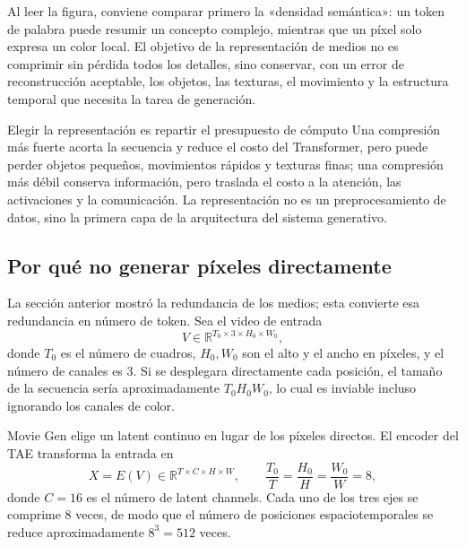 
Al leer la figura, conviene comparar primero la «densidad semántica»: un token de palabra puede resumir un concepto complejo, mientras que un píxel solo expresa un color local. El objetivo de la representación de medios no es comprimir sin pérdida todos los detalles, sino conservar, con un error de reconstrucción aceptable, los objetos, las texturas, el movimiento y la estructura temporal que necesita la tarea de generación.

\begin{importantbox}{Elegir la representación es repartir el presupuesto de cómputo}
Una compresión más fuerte acorta la secuencia y reduce el costo del Transformer, pero puede perder objetos pequeños, movimientos rápidos y texturas finas; una compresión más débil conserva información, pero traslada el costo a la atención, las activaciones y la comunicación. La representación no es un preprocesamiento de datos, sino la primera capa de la arquitectura del sistema generativo.
\end{importantbox}

\subsection{Por qué no generar píxeles directamente}

La sección anterior mostró la redundancia de los medios; esta convierte esa redundancia en número de token. Sea el video de entrada
\[
V\in\mathbb R^{T_0\times 3\times H_0\times W_0},
\]
donde $T_0$ es el número de cuadros, $H_0,W_0$ son el alto y el ancho en píxeles, y el número de canales es 3. Si se desplegara directamente cada posición, el tamaño de la secuencia sería aproximadamente $T_0H_0W_0$, lo cual es inviable incluso ignorando los canales de color.


Movie Gen elige un latent continuo en lugar de los píxeles directos. El encoder del TAE transforma la entrada en
\[
X=E(V)\in\mathbb R^{T\times C\times H\times W},
\qquad
\frac{T_0}{T}=\frac{H_0}{H}=\frac{W_0}{W}=8,
\]
donde $C=16$ es el número de latent channels. Cada uno de los tres ejes se comprime 8 veces, de modo que el número de posiciones espaciotemporales se reduce aproximadamente $8^3=512$ veces.

